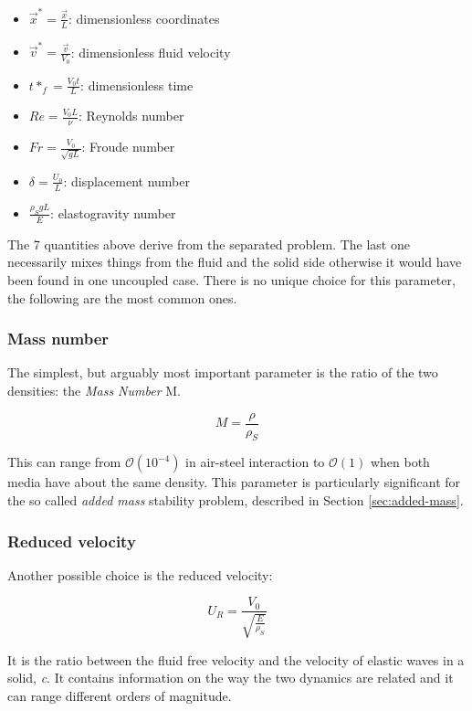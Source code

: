 \begin{itemize}
	\item $\vec{x}^* = \frac{\vec{x}}{L}$: dimensionless coordinates
	\item $\vec{v}^* = \frac{\vec{v}}{V_0}$: dimensionless fluid velocity
	\item $t*_f = \frac{V_0 t}{L}$: dimensionless time
	\item $Re = \frac{V_0 L}{\nu}$: Reynolds number
	\item $Fr = \frac{V_0}{\sqrt{gL}}$: Froude number
	\item $\delta = \frac{U_0}{L}$: displacement number
	\item $\frac{\rho_S g L}{E}$: elastogravity number
\end{itemize}

The 7 quantities above derive from the separated problem. The last one necessarily mixes things from the fluid and the solid side otherwise it would have been found in one uncoupled case. There is no unique choice for this parameter, the following are the most common ones.

\subsubsection{Mass number}

The simplest, but arguably most important parameter is the ratio of the two densities: the \textit{Mass Number} M.

\begin{equation}
	M = \frac{\rho}{\rho_S}
	\label{eq:mass-number}
\end{equation}

This can range from $\mathcal{O}\left(10^{-4}\right)$ in air-steel interaction to $\mathcal{O}\left(1\right)$ when both media have about the same density. This parameter is particularly significant for the so called \textit{added mass} stability problem, described in Section \ref{sec:added-mass}.

\subsubsection{Reduced velocity}

Another possible choice is the reduced velocity:

\begin{equation}
	 U_R = \frac{V_0}{\sqrt{\frac{E}{\rho_S}}}
\end{equation}

It is the ratio between the fluid free velocity and the velocity of elastic waves in a solid, \textit{c}. It contains information on the way the two dynamics are related and it can range different orders of magnitude.

